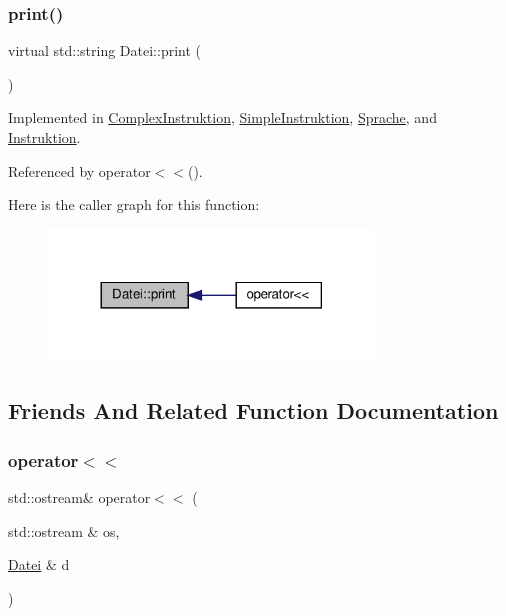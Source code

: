 \subsubsection{\texorpdfstring{print()}{print()}}
{\footnotesize\ttfamily virtual std\+::string Datei\+::print (\begin{DoxyParamCaption}{ }\end{DoxyParamCaption})\hspace{0.3cm}{\ttfamily [pure virtual]}}



Implemented in \mbox{\hyperlink{class_complex_instruktion_a476d0f6ed0296cd4751543c4be6ca422}{Complex\+Instruktion}}, \mbox{\hyperlink{class_simple_instruktion_a0533865319bd39a0ecd1db463d488cb8}{Simple\+Instruktion}}, \mbox{\hyperlink{class_sprache_a1e1e39e91e6d33e068fed01333fa99cc}{Sprache}}, and \mbox{\hyperlink{class_instruktion_a267ff36e98ec889cceccb2f464c36bc6}{Instruktion}}.



Referenced by operator$<$$<$().

Here is the caller graph for this function\+:
\nopagebreak
\begin{figure}[H]
\begin{center}
\leavevmode
\includegraphics[width=245pt]{class_datei_a5dedc9776ebe637f0842300f648d4b17_icgraph}
\end{center}
\end{figure}


\subsection{Friends And Related Function Documentation}
\mbox{\label{class_datei_aca7b8a47eeafb9d0860bebec55d21923}} 
\subsubsection{\texorpdfstring{operator$<$$<$}{operator<<}}
{\footnotesize\ttfamily std\+::ostream\& operator$<$$<$ (\begin{DoxyParamCaption}\item[{std\+::ostream \&}]{os,  }\item[{\mbox{\hyperlink{class_datei}{Datei}} \&}]{d }\end{DoxyParamCaption})\hspace{0.3cm}{\ttfamily [friend]}}

